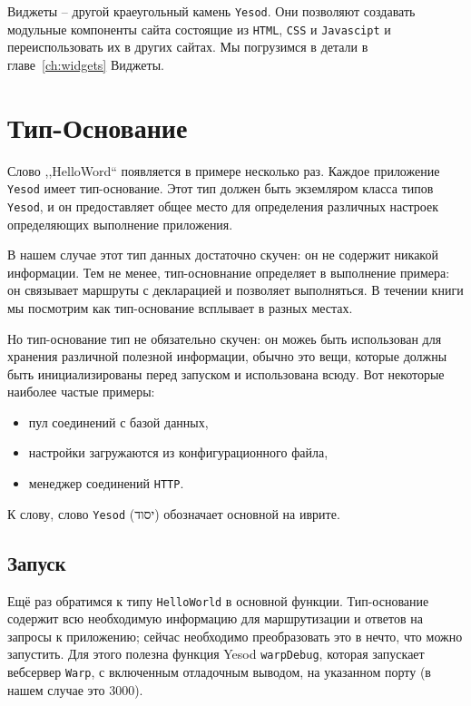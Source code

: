 Виджеты -- другой краеугольный камень \texttt{Yesod}. Они позволяют создавать 
модульные компоненты сайта состоящие из \texttt{HTML}, \texttt{CSS} и 
\texttt{Javascipt} и переиспользовать их в других сайтах. 
Мы погрузимся в детали в главе~\ref{ch:widgets} Виджеты.

\section{Тип-Основание}

Слово ,,HelloWord`` появляется в примере несколько раз. Каждое приложение 
\texttt{Yesod} имеет тип-основание. Этот тип должен быть экземляром класса 
типов \texttt{Yesod}, и он предоставляет общее место для определения 
различных настроек определяющих выполнение приложения.

В нашем случае этот тип данных достаточно скучен: он не содержит никакой 
информации. Тем не менее, тип-основнание определяет в выполнение примера: 
он связывает маршруты с декларацией и позволяет выполняться. 
В течении книги мы посмотрим как тип-основание всплывает в разных местах.

Но тип-основание тип не обязательно скучен: он можеь быть использован для 
хранения различной полезной информации, обычно это вещи,
которые должны быть инициализированы перед запуском и 
использована всюду. Вот некоторые наиболее частые примеры:

\begin{itemize}
  \item пул соединений с базой данных,
  \item настройки загружаются из конфигурационного файла,
  \item менеджер соединений \texttt{HTTP}.
\end{itemize}

К слову, слово \texttt{Yesod} (יסוד) обозначает основной на иврите.

\subsection{Запуск}

Ещё раз обратимся к типу \lstinline!HelloWorld! в основной функции.
Тип-основание содержит всю необходимую информацию для маршрутизации и 
ответов на запросы к приложению;
сейчас необходимо преобразовать это в нечто, что можно запустить. 
Для этого полезна функция Yesod \lstinline!warpDebug!, которая 
запускает вебсервер \texttt{Warp}, с включенным отладочным
выводом, на указанном порту (в нашем случае это $3000$).


